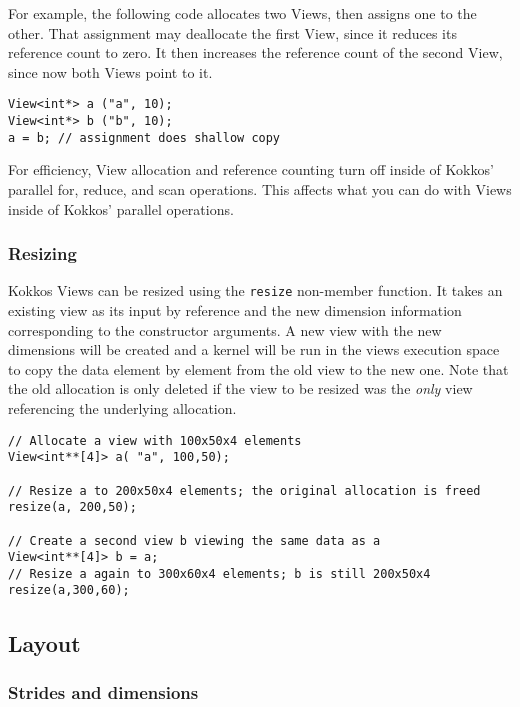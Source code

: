 For example, the following code allocates two Views, then assigns one
to the other.  That assignment may deallocate the first View, since it
reduces its reference count to zero.  It then increases the reference
count of the second View, since now both Views point to it.
\begin{lstlisting}
View<int*> a ("a", 10);
View<int*> b ("b", 10);
a = b; // assignment does shallow copy
\end{lstlisting}

For efficiency, View allocation and reference counting turn off inside
of Kokkos' parallel for, reduce, and scan operations.  This affects
what you can do with Views inside of Kokkos' parallel operations.

\subsubsection{Resizing}

Kokkos Views can be resized using the \lstinline|resize| non-member function.
It takes an existing view as its input by reference and the new dimension information
corresponding to the constructor arguments. A new view with the new dimensions will
be created and a kernel will be run in the views execution space to copy the data 
element by element from the old view to the new one. Note that the old allocation is 
only deleted if the view to be resized was the {\it only} view referencing the underlying 
allocation. 

\begin{lstlisting}
// Allocate a view with 100x50x4 elements 
View<int**[4]> a( "a", 100,50);

// Resize a to 200x50x4 elements; the original allocation is freed
resize(a, 200,50);

// Create a second view b viewing the same data as a
View<int**[4]> b = a;
// Resize a again to 300x60x4 elements; b is still 200x50x4
resize(a,300,60);
\end{lstlisting} 
 




\subsection{Layout}\label{S:View:Layout}

\subsubsection{Strides and dimensions}\label{SS:View:Layout:Strides}

